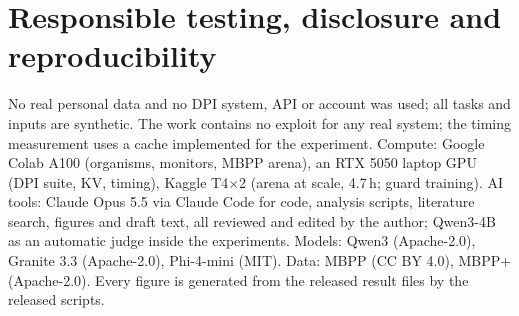 \documentclass[10pt,twocolumn]{article}
\begin{document}
\section*{Responsible testing, disclosure and reproducibility}
{\small No real personal data and no DPI system, API or account was used; all tasks and inputs are synthetic. The work contains no exploit for any real system; the timing measurement uses a cache implemented for the experiment. Compute: Google Colab A100 (organisms, monitors, MBPP arena), an RTX 5050 laptop GPU (DPI suite, KV, timing), Kaggle T4$\times$2 (arena at scale, 4.7\,h; guard training). AI tools: Claude Opus 5.5 via Claude Code for code, analysis scripts, literature search, figures and draft text, all reviewed and edited by the author; Qwen3-4B as an automatic judge inside the experiments. Models: Qwen3 (Apache-2.0), Granite 3.3 (Apache-2.0), Phi-4-mini (MIT). Data: MBPP (CC BY 4.0), MBPP+ (Apache-2.0). Every figure is generated from the released result files by the released scripts.\par}
\end{document}
